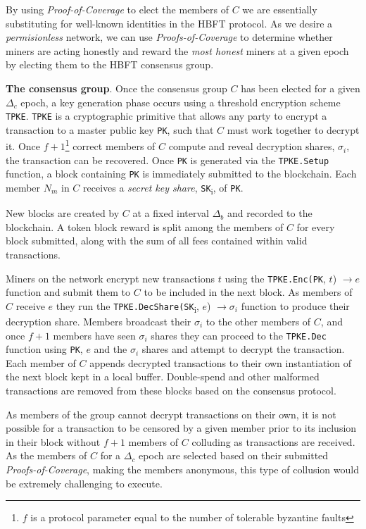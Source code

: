 \documentclass[UTF8, 10pt, nonatbib, nocopyrightspace, reprint]{sigplanconf}
\begin{document}
By using \emph{Proof-of-Coverage} to elect the members of $C$ we are essentially substituting for well-known identities in the HBFT protocol. As we desire a \emph{permisionless} network, we can use \emph{Proofs-of-Coverage} to determine whether miners are acting honestly and reward the \emph{most honest} miners at a given epoch by electing them to the HBFT consensus group.

\textbf{The consensus group}. Once the consensus group $C$ has been elected for a given $\Delta_c$ epoch, a key generation phase occurs using a threshold encryption scheme \verb|TPKE|. \verb|TPKE| is a cryptographic primitive that allows any party to encrypt a transaction to a master public key \verb|PK|, such that $C$ must work together to decrypt it. Once $f + 1$\footnote{$f$ is a protocol parameter equal to the number of tolerable byzantine faults} correct members of $C$ compute and reveal decryption shares, $\sigma_i$, the transaction can be recovered. Once \verb|PK| is generated via the \verb|TPKE.Setup| function, a block containing \verb|PK| is immediately submitted to the blockchain. Each member $N_m$ in $C$ receives a \emph{secret key share}, \verb|SK|\textsubscript{i}, of \verb|PK|. 

New blocks are created by $C$ at a fixed interval $\Delta_b$ and recorded to the blockchain. A token block reward is split among the members of $C$ for every block submitted, along with the sum of all fees contained within valid transactions. 

Miners on the network encrypt new transactions $t$ using the \verb|TPKE.Enc(PK|, $t$) $\rightarrow e$ function and submit them to $C$ to be included in the next block. As members of $C$ receive $e$ they run the \verb|TPKE.DecShare(SK|\textsubscript{i}, $e$) $\rightarrow \sigma_i$ function to produce their decryption share. Members broadcast their $\sigma_i$ to the other members of $C$, and once $f + 1$ members have seen $\sigma_i$ shares they can proceed to the \verb|TPKE.Dec| function using \verb|PK|, $e$ and the $\sigma_i$ shares and attempt to decrypt the transaction. Each member of $C$ appends decrypted transactions to their own instantiation of the next block kept in a local buffer. Double-spend and other malformed transactions are removed from these blocks based on the consensus protocol.

As members of the group cannot decrypt transactions on their own, it is not possible for a transaction to be censored by a given member prior to its inclusion in their block without $f + 1$ members of $C$ colluding as transactions are received. As the members of $C$ for a $\Delta_c$ epoch are selected based on their submitted \emph{Proofs-of-Coverage}, making the members anonymous, this type of collusion would be extremely challenging to execute.
\end{document}
